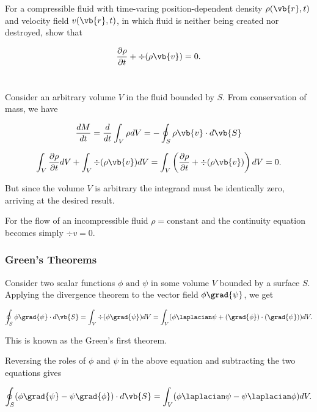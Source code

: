 \documentclass[english,a4paper,12pt]{report}
\begin{document}
{For a compressible fluid with time-varing position-dependent density \(\rho (\vb{r}, t)\) and velocity field \(v(\vb{r}, t)\), in which fluid is neither being created nor destroyed, show that 

\begin{equation}
	\frac{\partial \rho }{\partial t} + \div{(\rho \vb{v} )} = 0.
\end{equation}~
}
{Consider an arbitrary volume \(V\) in the fluid bounded by \(S\). From conservation of mass, we have

\begin{equation}
	\frac{dM}{dt} = \frac{d}{dt} \int_{V}^{} \rho dV = - \oint_{S} \rho \vb{v} \cdot d\vb{S} 
\end{equation}

\begin{equation}
	\int_{V}^{} \frac{\partial \rho }{\partial t}dV + \int_{V}^{} \div{(\rho \vb{v} )} dV = \int_{V}^{} \left( \frac{\partial \rho }{\partial t} + \div{(\rho \vb{v} )}  \right) dV = 0.    
\end{equation}

But since the volume \(V\) is arbitrary the integrand must be identically zero, arriving at the desired result.

For the flow of an incompressible fluid \(\rho = \text{constant} \) and the continuity equation becomes simply \(\div{v} = 0\).~
}

\subsubsection{Green's Theorems}

Consider two scalar functions \(\phi \text { and } \psi \) in some volume \(V\) bounded by a surface \(S\). Applying the divergence theorem to the vector field \(\phi \grad{\psi } \), we get 

\begin{equation}
	\oint_{S} \phi \grad{\psi } \cdot d\vb{S} = \int_{V}^{} \div{(\phi \grad{\psi } )}dV = \int_{V}^{} (\phi \laplacian \psi +(\grad{\phi } )\cdot (\grad{\psi } ))dV.   
\end{equation}

This is known as the Green's first theorem. 

Reversing the roles of \(\phi \text { and } \psi \) in the above equation and subtracting the two equations gives

\begin{equation}
	\oint_{S} (\phi \grad{\psi } - \psi \grad{\phi } ) \cdot d\vb{S}  = \int_{V}^{} (\phi \laplacian \psi - \psi \laplacian \phi ) dV. 
\end{equation}
\end{document}
